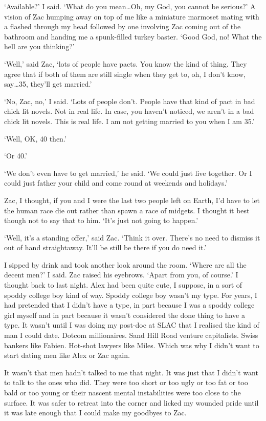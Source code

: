 `Available?' I said. `What do you mean\dots Oh, my God, you cannot
be serious?' A vision of Zac humping away on top of me like a miniature marmoset mating with a  flashed
through my head followed by one involving Zac coming out of the
bathroom and handing me a spunk-filled turkey baster. `Good God, no! What
the hell are you thinking?'

`Well,' said Zac, `lots of people have pacts. You know the kind of
thing. They agree that if both of them are still single when they
get to, oh, I don't know, say\dots 35, they'll get married.'

`No, Zac, no,' I said. `Lots of people don't. People have that kind
of pact in bad chick lit novels. Not in real life. In case, you
haven't noticed, we aren't in a bad chick lit novels. This is real life. I am not getting married to you
when I am 35.'

`Well, OK, 40 then.'

`Or 40.'

`We don't even have to get married,' he said. `We could just live together. Or I could just father
your child and come round at weekends and holidays.'

Zac, I thought, if you and I were the last two people left on Earth,
I'd have to let the human race die out rather than spawn a race of midgets.
I thought it best though not to say that to him. `It's just not
going to happen.'

`Well, it's a standing offer,' said Zac. `Think it over. There's no
need to dismiss it out of hand straightaway. It'll be still be there if you do need it.'

I sipped by drink and took another look around the room. `Where are
all the decent men?' I said. Zac raised his eyebrows. `Apart from
you, of course.' I thought back to last night. Alex had been quite
cute, I suppose, in a sort of spoddy college boy kind of way. Spoddy
college boy wasn't my type. For years, I had pretended that I didn't
have a type, in part because I was a spoddy college girl myself and
in part because it wasn't considered the done thing to have a type.
It wasn't until I was doing my post-doc at SLAC that I realised the
kind of man I could date. Dotcom millionaires. Sand Hill Road
venture capitalists. Swiss bankers like Fabien. Hot-shot lawyers like Miles. Which was why I
didn't want to start dating men like Alex or Zac again.

It wasn't that men hadn't talked to me that night. It was just that
I didn't want to talk to the ones who did. They were too short or
too ugly or too fat or too bald or too young or their nascent mental
instabilities were too close to the surface. It was safer to retreat
into the corner and licked my wounded pride until it was late enough
that I could make my goodbyes to Zac.

